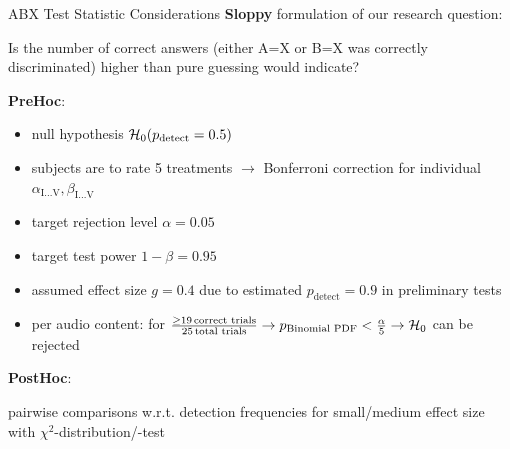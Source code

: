 \documentclass[mathserif]{intbeamer}
\begin{document}
\begin{frame}{ABX Test Statistic Considerations}
\textbf{Sloppy} formulation of our research question:

Is the number of correct answers (either A=X or B=X was correctly discriminated)
higher than pure guessing would indicate?
\vspace{0.25cm}

\textbf{PreHoc}:
\begin{itemize}
\item
null hypothesis $\mathcal{H}_{0}(p_\text{detect}=0.5)$
\item
subjects are to rate 5 treatments $\rightarrow$ Bonferroni correction for individual $\alpha_\text{I...V}, \beta_\text{I...V}$
\item
target rejection level $\alpha=0.05$
\item
target test power $1-\beta = 0.95$

\item
assumed effect size $g=0.4$ due to estimated $p_\text{detect}=0.9$ in preliminary tests
\item
\textcolor{colnonzero}{per audio content}:
for $\frac{\geq 19\,\text{correct trials}}{25\,\text{total trials}}
\rightarrow p_\text{Binomial PDF}<\frac{\alpha}{5} \rightarrow\mathcal{H}_{0}$
can be rejected
\end{itemize}
%
\vspace{0.25cm}

\textbf{PostHoc}:

pairwise comparisons w.r.t. detection frequencies for small/medium effect size
with $\chi^2$-distribution/-test

\end{frame}
%
%
%
\end{document}
